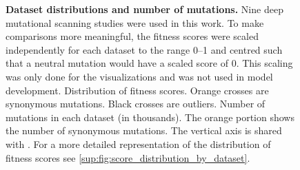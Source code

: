 \begin{figure}[!htb]
	\ffigbox{%
		\begin{subfloatrow}
			\ffigbox[\FBwidth]{}{\caption{}\label{subfig:fitness_score_distribution}}%
			\ffigbox[\FBwidth]{}{\caption{}\label{subfig:datasets_abundancies}}%
		\end{subfloatrow}%
	}
	{\caption[Dataset distributions and number of mutations]{%
			\textbf{Dataset distributions and number of mutations.} Nine deep mutational scanning studies were used in this work.
			To make comparisons more meaningful, the fitness scores were scaled independently for each dataset to the range \numrange{0}{1} and centred such that a neutral mutation would have a scaled score of \num{0}.
			This scaling was only done for the visualizations and was not used in model development.
			 Distribution of fitness scores.
			Orange crosses are synonymous mutations. Black crosses are outliers.
			 Number of mutations in each dataset (in thousands).
			The orange portion shows the number of synonymous mutations.
			The vertical axis is shared with .
			For a more detailed representation of the distribution of fitness scores see \autoref{sup:fig:score_distribution_by_dataset}.
		}}
\end{figure}

